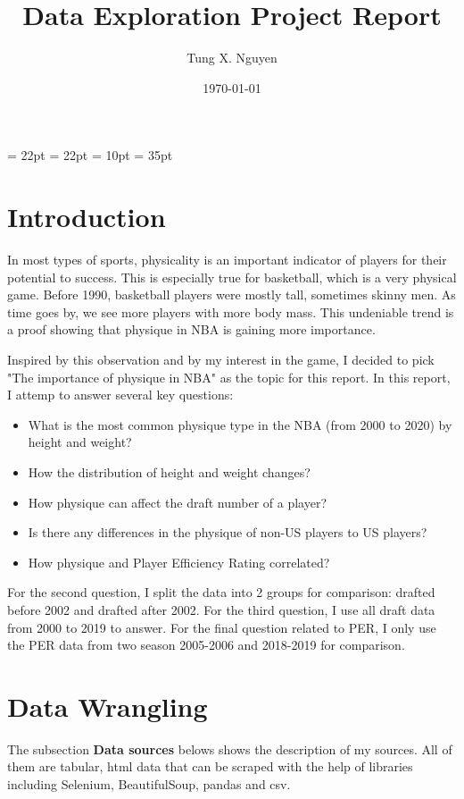 \documentclass[a4paper,12pt,twoside]{article}
\title{Data Exploration Project Report}
\author{Tung X. Nguyen}
\date{\today}
\numberwithin{equation}{section}
\begin{document}
\maketitle
\thispagestyle{empty}

\tableofcontents
\listoffigures
\thispagestyle{empty}


\oddsidemargin = 22pt
\evensidemargin = 22pt
\marginparsep = 10pt
\marginparwidth = 35pt


\section{Introduction}
In most types of sports, physicality is an important indicator of players for their potential to success. This is especially true for basketball, which is a very physical game. Before 1990, basketball players were mostly tall, sometimes skinny men. As time goes by, we see more players with more body mass. This undeniable trend is a proof showing that physique in NBA is gaining more importance.

Inspired by this observation and by my interest in the game, I decided to pick "The importance of physique in NBA" as the topic for this report. In this report, I attemp to answer several key questions:
\begin{itemize}
\item What is the most common physique type in the NBA (from 2000 to 2020) by height and weight?
\item How the distribution of height and weight changes?
\item How physique can affect the draft number of a player?
\item Is there any differences in the physique of non-US players to US players?
\item How physique and Player Efficiency Rating correlated?
\end{itemize}

For the second question, I split the data into 2 groups for comparison: drafted before 2002 and drafted after 2002. For the third question, I use all draft data from 2000 to 2019 to answer. For the final question related to PER, I only use the PER data from two season 2005-2006 and 2018-2019 for comparison.



\section{Data Wrangling}
The subsection \textbf{Data sources} belows shows the description of my sources. All of them are tabular, html data that can be scraped with the help of libraries including Selenium, BeautifulSoup, pandas and csv.
\end{document}
